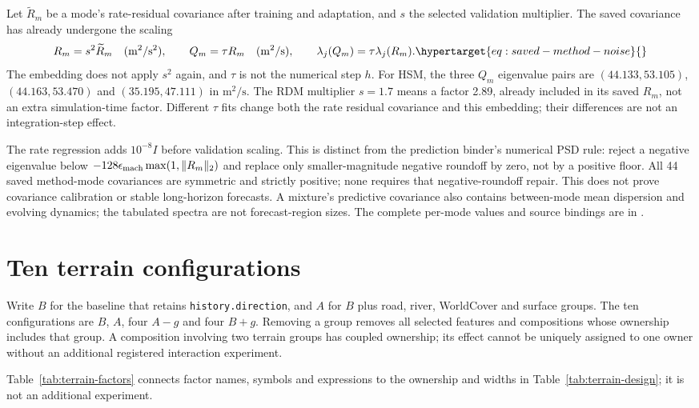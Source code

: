 Let $\widetilde R_m$ be a mode's rate-residual covariance after training and
adaptation, and $s$ the selected validation multiplier. The saved covariance
has already undergone the scaling
\begin{equation}
 R_m=s^2\widetilde R_m\quad(\mathrm{m}^2/\mathrm{s}^2),\qquad
 Q_m=\tau R_m\quad(\mathrm{m}^2/\mathrm{s}),\qquad
 \lambda_j(Q_m)=\tau\lambda_j(R_m).
 \label{eq:saved-method-noise}\hypertarget{eq:saved-method-noise}{}
\end{equation}
The embedding does not apply $s^2$ again, and $\tau$ is not the numerical
step $h$. For HSM, the three $Q_m$ eigenvalue pairs are
$(44.133,53.105)$, $(44.163,53.470)$ and $(35.195,47.111)$ in
$\mathrm{m}^2/\mathrm{s}$. The RDM multiplier $s=1.7$ means a factor 2.89,
already included in its saved $R_m$, not an extra simulation-time factor.
Different $\tau$ fits change both the rate residual covariance and this
embedding; their differences are not an integration-step effect.

The rate regression adds $10^{-8}I$ before validation scaling. This is
distinct from the prediction binder's numerical PSD rule: reject a negative
eigenvalue below $-128\epsilon_{\rm mach}\max(1,\|R_m\|_2)$ and replace only
smaller-magnitude negative roundoff by zero, not by a positive floor.
All 44 saved method-mode covariances are symmetric and strictly positive;
none requires that negative-roundoff repair. This does not prove covariance
calibration or stable long-horizon forecasts. A mixture's predictive
covariance also contains between-mode mean dispersion and evolving dynamics;
the tabulated spectra are not forecast-region sizes. The complete per-mode
values and source bindings are in
.


\section{Ten terrain configurations}
Write \(B\) for the baseline that retains \texttt{history.direction}, and
\(A\) for \(B\) plus road, river, WorldCover and surface groups. The ten
configurations are \(B\), \(A\), four \(A-g\) and four \(B+g\). Removing a
group removes all selected features and compositions whose ownership includes
that group. A composition involving two terrain groups has coupled ownership;
its effect cannot be uniquely assigned to one owner without an additional
registered interaction experiment.

Table~\ref{tab:terrain-factors} connects factor names, symbols and expressions to the ownership and widths in Table~\ref{tab:terrain-design}; it is not an additional experiment.

